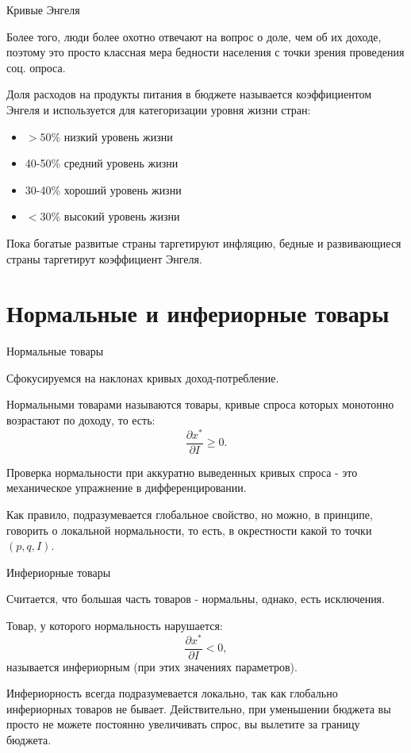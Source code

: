 \documentclass{beamer}
\begin{document}
\begin{frame}{Кривые Энгеля}

Более того, люди более охотно отвечают на вопрос о доле, чем об их доходе, поэтому это просто классная мера бедности населения с точки зрения проведения соц. опроса.

Доля расходов на продукты питания в бюджете называется \alert{коэффициентом Энгеля} и используется для категоризации уровня жизни стран:

\begin{itemize}
  \item $>50\%$ низкий уровень жизни  
  \item 40-50\% средний уровень жизни
  \item 30-40\% хороший уровень жизни
  \item $<30\%$ высокий уровень жизни
\end{itemize}

Пока богатые развитые страны таргетируют инфляцию, бедные и развивающиеся страны таргетирут коэффициент Энгеля.

\end{frame}


\section{Нормальные и инфериорные товары}

\begin{frame}{Нормальные товары}

Сфокусируемся на наклонах кривых доход-потребление.

\begin{definition}
\alert{Нормальными товарами} называются товары, кривые спроса которых монотонно возрастают по доходу, то есть:
$$\frac{\partial x^{\ast}}{\partial I} \geqslant 0.$$
\end{definition}
Проверка нормальности при аккуратно выведенных кривых спроса - это механическое упражнение в дифференцировании. 

Как правило, подразумевается глобальное свойство, но можно, в принципе, говорить о локальной нормальности, то есть, в окрестности какой то точки $(p,q,I)$.

\end{frame}

\begin{frame}{Инфериорные товары}

Считается, что большая часть товаров - нормальны, однако, есть исключения.

\begin{definition}
Товар, у которого нормальность нарушается:
$$\frac{\partial x^{\ast}}{\partial I} < 0,$$ 
называется \alert{инфериорным} (при этих значениях параметров). 
\end{definition}

Инфериорность всегда подразумевается локально, так как \alert{глобально инфериорных товаров не бывает}. Действительно, при уменьшении бюджета вы просто не можете постоянно увеличивать спрос, вы вылетите за границу бюджета.

\end{frame}
\end{document}
